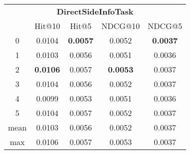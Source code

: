 \documentclass{article}
\begin{document}
 

\begin{tabular}{c|cccc}

\multicolumn{5}{c}{\textbf{DirectSideInfoTask}} \\
\noalign{\smallskip}
\noalign{\smallskip}
\toprule
\multicolumn{1}{c}{Template ID} & \multicolumn{1}{|c}{Hit@10} & \multicolumn{1}{c}{Hit@5} & \multicolumn{1}{c}{NDCG@10} & \multicolumn{1}{c}{NDCG@5} \\
\midrule
0 & 0.0104 & \textbf{0.0057} & 0.0052 & \textbf{0.0037} \\
1 & 0.0103 & 0.0056 & 0.0051 & 0.0036 \\
2 & \textbf{0.0106} & 0.0057 & \textbf{0.0053} & 0.0037 \\
3 & 0.0104 & 0.0056 & 0.0052 & 0.0037 \\
4 & 0.0099 & 0.0053 & 0.0051 & 0.0036 \\
5 & 0.0104 & 0.0057 & 0.0052 & 0.0037 \\
\midrule
mean & 0.0103 & 0.0056 & 0.0052 & 0.0037 \\
max & 0.0106 & 0.0057 & 0.0053 & 0.0037 \\
\bottomrule

\end{tabular}
\end{document}
